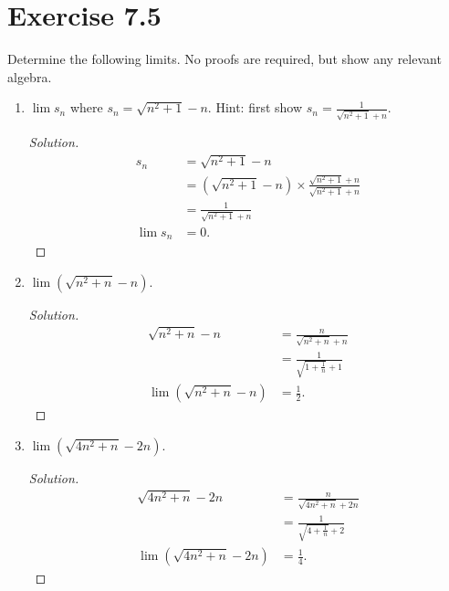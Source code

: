 \documentclass{article}
\begin{document}
\section*{Exercise 7.5}
Determine the following limits. No proofs are required, but show any relevant algebra.
\begin{enumerate}[label=(\alph*)]
    \item $\lim s_n$ where $s_n=\sqrt{n^2+1}-n$. Hint: first show $s_n =\frac{1}{\sqrt{n^2+1}+n}$.
    \begin{proof}[Solution]
        \begin{align*}
            s_n & = \sqrt{n^2+1}-n \\
            & = \left(\sqrt{n^2+1}-n\right) \times \frac{\sqrt{n^2+1}+n}{\sqrt{n^2+1}+n} \\
            & = \frac{1}{\sqrt{n^2+1}+n} \\
            \lim s_n & = 0.
        \end{align*}
    \end{proof}
    \item $\lim (\sqrt{n^2+n}-n)$.
    \begin{proof}[Solution]
        \begin{align*}
            \sqrt{n^2+n}-n & = \frac{n}{\sqrt{n^2+n}+n} \\
            & = \frac{1}{\sqrt{1+\frac{1}{n}}+1} \\
            \lim \left(\sqrt{n^2+n}-n\right) & = \frac{1}{2}.
        \end{align*}
    \end{proof}
    \item $\lim (\sqrt{4n^2+n}-2n)$.
    \begin{proof}[Solution]
        \begin{align*}
            \sqrt{4n^2+n}-2n & = \frac{n}{\sqrt{4n^2+n}+2n} \\
            & = \frac{1}{\sqrt{4+\frac{1}{n}}+2} \\
            \lim \left(\sqrt{4n^2+n}-2n\right) & = \frac{1}{4}.
        \end{align*}
    \end{proof}
\end{enumerate}
\end{document}
